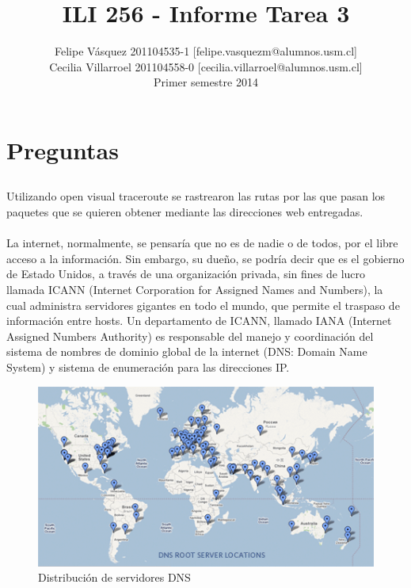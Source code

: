 \documentclass[a4paper,10pt]{article}
\author{Felipe V\'asquez 201104535-1 [felipe.vasquezm@alumnos.usm.cl]\\Cecilia Villarroel 201104558-0 [cecilia.villarroel@alumnos.usm.cl]\\ Primer semestre 2014}
\title{ILI 256 - Informe Tarea 3}
\begin{document}
\maketitle


\section{Preguntas}



\subsection{} 
\raggedright Utilizando open visual traceroute se rastrearon las rutas por las que pasan los paquetes que se quieren obtener mediante las direcciones web entregadas.\\ \\

La internet, normalmente, se pensaría que no es de nadie o de todos, por el libre acceso a la información. Sin embargo, su dueño, se podría decir que es el gobierno de Estado Unidos, a través de una organización privada, sin fines de lucro llamada ICANN  (Internet Corporation for Assigned Names and Numbers), la cual administra servidores gigantes en todo el mundo, que permite el traspaso de información entre hosts. Un departamento de ICANN, llamado IANA (Internet Assigned Numbers Authority) es responsable del manejo y coordinación del sistema de nombres de dominio global de la internet (DNS: Domain Name System) y sistema de enumeración para las direcciones IP. \\

\begin{figure}[H]
\centering
\includegraphics[height=6 cm]{imagenes/root-servers.png}
\caption{Distribución de servidores DNS}
\end{figure} \\ 
\end{document}
